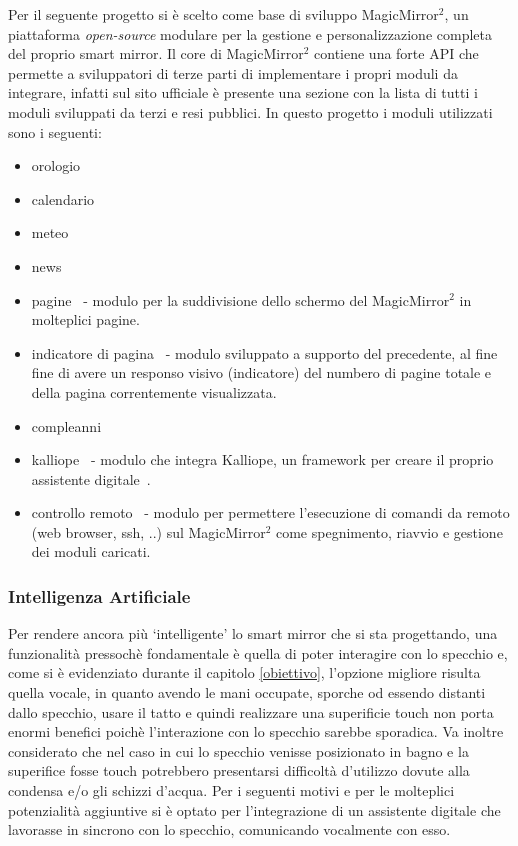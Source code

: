 \documentclass[12pt,a4paper]{article}
\begin{document}
Per il seguente progetto si \`e scelto come base di sviluppo MagicMirror$^2$\cite{MagicMirrorRepo}, un piattaforma
\textit{open-source} modulare per la gestione e personalizzazione completa del proprio smart mirror. Il core di 
MagicMirror$^2$ contiene una forte API che permette a sviluppatori di terze parti di implementare i propri moduli
da integrare, infatti sul sito ufficiale\cite{MagicMirrorSite} \`e presente una sezione con la lista di tutti i
moduli sviluppati da terzi e resi pubblici\cite{MagicMirrorModules}. In questo progetto i moduli utilizzati sono i
seguenti:
\begin{itemize}
  \item orologio
  \item calendario
  \item meteo
  \item news
  \item pagine~\cite{Pages} - modulo per la suddivisione dello schermo del MagicMirror$^2$ in molteplici pagine.
  \item indicatore di pagina~\cite{PageIndicator} - modulo sviluppato a supporto del precedente, al fine fine di
      avere un responso visivo (indicatore) del numbero di pagine totale e della pagina correntemente visualizzata.
  \item compleanni
  \item kalliope~\cite{KalliopeModule} - modulo che integra Kalliope, un framework per creare il proprio assistente
      digitale~\cite{KalliopeRepo}.
  \item controllo remoto~\cite{RemoteControl} - modulo per permettere l'esecuzione di comandi da remoto (web browser, ssh, ..)
      sul MagicMirror$^2$ come spegnimento, riavvio e gestione dei moduli caricati.
\end{itemize}

\subsubsection{Intelligenza Artificiale}\label{ai}

Per rendere ancora pi\`u `intelligente' lo smart mirror che si sta progettando, una funzionalit\`a pressoch\`e
fondamentale \`e quella di poter interagire con lo specchio e, come si \`e evidenziato durante il capitolo
\ref{obiettivo}, l'opzione migliore risulta quella vocale, in quanto avendo le mani occupate, sporche od essendo
distanti dallo specchio, usare il tatto e quindi realizzare una superificie touch non porta enormi benefici poich\`e
l'interazione con lo specchio sarebbe sporadica. Va inoltre considerato che nel caso in cui lo specchio venisse posizionato
in bagno e la superifice fosse touch potrebbero presentarsi difficolt\`a d'utilizzo dovute alla condensa e/o gli schizzi
d'acqua. Per i seguenti motivi e per le molteplici potenzialit\`a aggiuntive si \`e optato per l'integrazione di un
assistente digitale che lavorasse in sincrono con lo specchio, comunicando vocalmente con esso.
\end{document}
